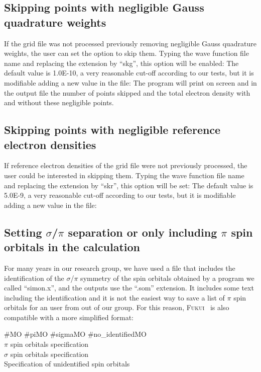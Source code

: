 \documentclass[a4paper,11pt,openany]{memoir}
\newcommand\programa{\textsc{Fukui}}
\begin{document}
\subsection{Skipping points with negligible Gauss quadrature weights}
If the grid file was not processed previously removing negligible Gauss quadrature weights, the user can set the option to skip them. Typing the wave function file name and replacing the extension by ``skg'', this option will be enabled:
The default value is \num{1.0E-10}, a very reasonable cut-off according to our tests, but it is modifiable adding a new value in the file:
The program will print on screen and in the output file the number of points skipped and  the total electron density with and without these negligible points.

\subsection{Skipping points with negligible reference electron densities}
If reference electron densities of the grid file were not previously processed, the user could be interested in skipping them. Typing the wave function file name and replacing the extension by ``skr'', this option will be set:
The default value is \num{5.0E-9}, a very reasonable cut-off according to our tests, but it is modifiable adding a new value in the file:

\subsection{Setting $\sigma$/$\pi$ separation or only including $\pi$ spin orbitals in the calculation}
For many years in our research group, we have used a file that includes the identification of the $\sigma$/$\pi$ symmetry of the spin orbitals obtained by a program we called ``simon.x'', and the outputs use the ``.som'' extension. It includes some text including the identification and it is not the easiest way to save a list of $\pi$ spin orbitals for an user from out of our group. For this reason, \programa~ is also compatible with a more simplified format:
\begin{tcolorbox}[
	colback=blue!5!black!5!,
	colframe=blue!75!black,
	fontupper=\bfseries,
	colupper=blue!5!black,
	colbacktitle=blue!75!black,
	size=small,
	title={Structure and format of a .sg file}
				]
					\#MO \#piMO \#sigmaMO \#no\_identifiedMO\\
					$\pi$ spin orbitals specification\\
					$\sigma$ spin orbitals specification\\
					Specification of unidentified spin orbitals\\
\end{tcolorbox}
\end{document}

